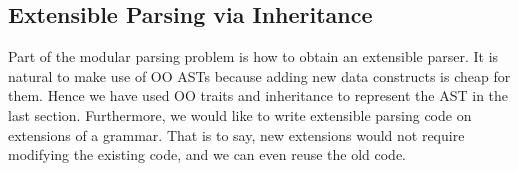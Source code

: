\begin{comment}
This section introduces the problem of semantic modular parsing which motivates our work, and an initial solution using only standard inheritance in OO.

\subsection{Modular Parsing Problem}\label{subsec:parsingproblem}
\huang{or "Parsing Extensible ASTs" ?}
The extensibility issues of AST structures and operations that process them, can be illustrated by the famous Expression Problem~\cite{wadler1998expression}. There are two dimensions of extensibility:

\begin{itemize}
\item \textbf{Extension 1}: adding a new data variant (or rather, a new constructor of ASTs).
\item \textbf{Extension 2}: adding a new operation over ASTs.
\end{itemize}

We already have solutions such Object Algebras~\cite{Oliveira:2012} for this problem. However, when ASTs evolve, the corresponding parsers which produce such structures should also change accordingly. Our motivation is to build modular parsers, which can be extended together with ASTs. Futhermore, we focus on semantic modularity, that means we expect parsers to be modularly type-checked and separately compiled.

In the rest of Section~\ref{sec:inheritance}, we will introduce an solution for modular parsing with Extension 1 above, using only standard inheritance in OO. Extension 2 will be discussed in Section~\ref{sec:algebrasandparsing}.
\end{comment}

\subsection{Extensible Parsing via Inheritance}

Part of the modular parsing problem is how to obtain an extensible parser. It
is natural to make use of OO ASTs because adding new data constructs is cheap for
them. Hence we have used OO traits and inheritance to represent the AST in the last
section. Furthermore, we would like to write extensible parsing code on extensions of
a grammar. That is to say, new extensions would not require modifying the existing code,
and we can even reuse the old code.


